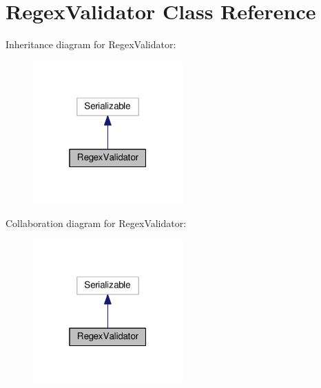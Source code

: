 \hypertarget{classRegexValidator}{}\section{Regex\+Validator Class Reference}
\label{classRegexValidator}


Inheritance diagram for Regex\+Validator\+:
\nopagebreak
\begin{figure}[H]
\begin{center}
\leavevmode
\includegraphics[width=163pt]{classRegexValidator__inherit__graph}
\end{center}
\end{figure}


Collaboration diagram for Regex\+Validator\+:
\nopagebreak
\begin{figure}[H]
\begin{center}
\leavevmode
\includegraphics[width=163pt]{classRegexValidator__coll__graph}
\end{center}
\end{figure}
